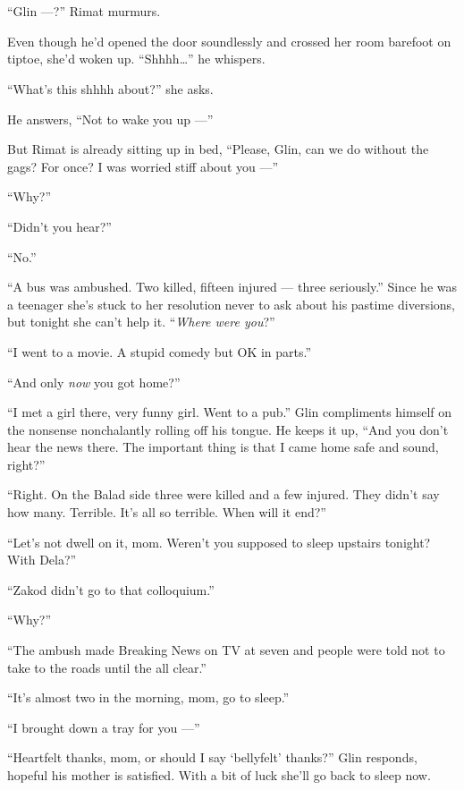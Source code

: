 \documentclass[twoside,11pt,openany]{book}
\begin{document}
\chapter{}

``Glin ---?'' Rimat murmurs.

Even though he'd opened the door soundlessly and crossed her room barefoot on tiptoe, she'd woken up.
``Shhhh{\ldots}'' he whispers.

``What's this shhhh about?'' she asks.

He answers, ``Not to wake you up ---''

But Rimat is already sitting up in bed, ``Please, Glin, can we do without the gags? For once? I was worried
stiff about you ---''

``Why?''

``Didn't you hear?''

``No.''

``A bus was ambushed. Two killed, fifteen injured --- three seriously.'' Since he was a teenager
she's stuck to her resolution never{ }to ask about his
pastime diversions, but tonight she can't help it.
``\textit{Where were you}?''

``I went to a movie. A stupid comedy but OK in parts.''

``And only \textit{now} you got home?''

``I met a girl there, very funny girl. Went to a pub.'' Glin compliments himself on the
nonsense nonchalantly rolling off his tongue. He keeps it up, ``And you don't hear the news there. The
important thing is that I came home safe and sound, right?''

``Right. On the Balad side three were killed and a few injured. They didn't say how many. Terrible. It's
all so terrible. When will it end?''

``Let's not dwell on it, mom. Weren't you supposed to sleep upstairs tonight? With Dela?''

``Zakod didn't go to that colloquium.''

``Why?''

``The ambush made Breaking News on TV at seven and people were told not to take to the roads until the all
clear.''

``It's almost two in the morning, mom, go to sleep.''

``I brought down a tray for you ---''

``Heartfelt thanks, mom, or should I say `bellyfelt' thanks?'' Glin responds, hopeful his
mother is satisfied. With a bit of luck she'll go back to sleep now.
\end{document}
